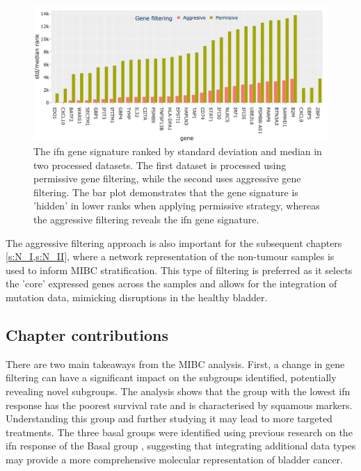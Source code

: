 \begin{figure}[!htb]
    \centering
    \includegraphics[width=1.0\textwidth,keepaspectratio]{Sections/Gene_Sel/ifng_ranks.png}
    \caption[Std/median ranks of the genes in \acrlong{ifn} signature]{The \acrshort{ifn} gene signature \citep{Baker2022-bj} ranked by standard deviation and median in two processed datasets. The first dataset is processed using permissive gene filtering, while the second uses aggressive gene filtering. The bar plot demonstrates that the gene signature is 'hidden' in lower ranks when applying permissive strategy, whereas the aggressive filtering reveals the \acrshort{ifn} gene signature.}
      \label{fig:ifng_rank_genes}
\end{figure}


The aggressive filtering approach is also important for the subsequent chapters \cref{s:N_I,s:N_II}, where a network representation of the non-tumour samples is used to inform MIBC stratification. This type of filtering is preferred as it selects the 'core' expressed genes across the samples and allows for the integration of mutation data, mimicking disruptions in the healthy bladder.

\subsection{Chapter contributions}

There are two main takeaways from the MIBC analysis. First, a change in gene filtering can have a significant impact on the subgroups identified, potentially revealing novel subgroups. The analysis shows that the group with the lowest \acrlong{ifn} response has the poorest survival rate and is characterised by squamous markers. Understanding this group and further studying it may lead to more targeted treatments. The three basal groups were identified using previous research on the \acrshort{ifn} response of the Basal group \citep{Baker2022-bj}, suggesting that integrating additional data types may provide a more comprehensive molecular representation of bladder cancer.

